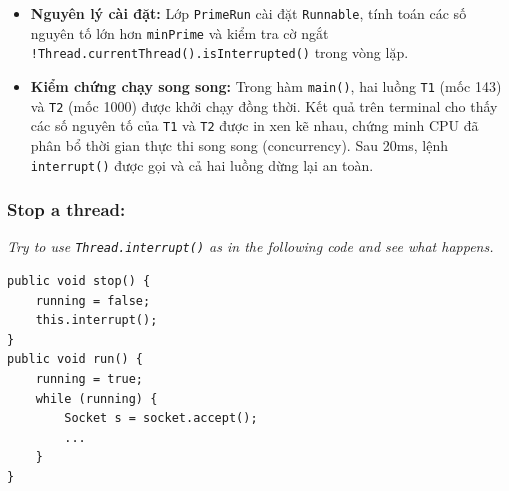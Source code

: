 \documentclass[11pt,a4paper]{article}
\begin{document}
\begin{solutionbox}[title=Báo cáo \& Bài làm: Lập trình Đa luồng (PrimeRun.java)]
\begin{itemize}
    \item \textbf{Nguyên lý cài đặt:} Lớp \texttt{PrimeRun} cài đặt \texttt{Runnable}, tính toán các số nguyên tố lớn hơn \texttt{minPrime} và kiểm tra cờ ngắt \texttt{!Thread.currentThread().isInterrupted()} trong vòng lặp.
    \item \textbf{Kiểm chứng chạy song song:} Trong hàm \texttt{main()}, hai luồng \texttt{T1} (mốc 143) và \texttt{T2} (mốc 1000) được khởi chạy đồng thời. Kết quả trên terminal cho thấy các số nguyên tố của \texttt{T1} và \texttt{T2} được in xen kẽ nhau, chứng minh CPU đã phân bổ thời gian thực thi song song (concurrency). Sau 20ms, lệnh \texttt{interrupt()} được gọi và cả hai luồng dừng lại an toàn.
\end{itemize}
\end{solutionbox}

\vspace{0.4cm}

\subsubsection*{Stop a thread:}
\noindent\textit{Try to use \texttt{Thread.interrupt()} as in the following code and see what happens.}
\begin{lstlisting}
public void stop() {
    running = false;
    this.interrupt();
}
public void run() {
    running = true;
    while (running) {
        Socket s = socket.accept();
        ...
    }
}
\end{lstlisting}
\end{document}
